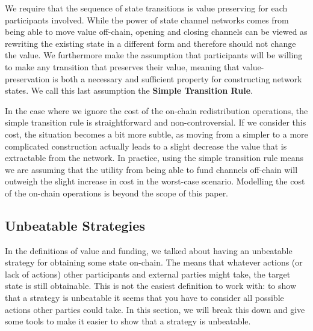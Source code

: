 We require that the sequence of state transitions is value preserving for each participants involved. 
While the power of state channel networks comes from being able to move value off-chain, opening and closing channels can be viewed as rewriting the existing state in a different form and therefore should not change the value.
We furthermore make the assumption that participants will be willing to make any transition that preserves their value, meaning that value-preservation is both a necessary and sufficient property for constructing network states.
We call this last assumption the \textbf{Simple Transition Rule}. 

In the case where we ignore the cost of the on-chain redistribution operations, the simple transition rule is straightforward and non-controversial.
If we consider this cost, the situation becomes a bit more subtle, as moving from a simpler to a more complicated construction actually leads to a slight decrease the value that is extractable from the network.
In practice, using the simple transition rule means we are assuming that the utility from being able to fund channels off-chain will outweigh the slight increase in cost in the worst-case scenario.
Modelling the cost of the on-chain operations is beyond the scope of this paper.

\subsection{Unbeatable Strategies}\label{sec:unbeatable-strategy}

In the definitions of value and funding, we talked about having an unbeatable strategy for obtaining some state on-chain.
The means that whatever actions (or lack of actions) other participants and external parties might take, the target state is still obtainable.
This is not the easiest definition to work with:
to show that a strategy is unbeatable it seems that you have to consider all possible actions other parties could take.
In this section, we will break this down and give some tools to make it easier to show that a strategy is unbeatable.

